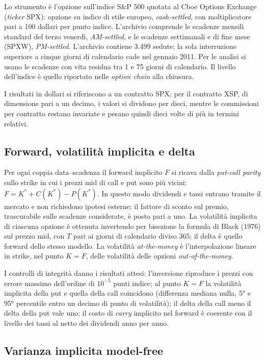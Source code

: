 \documentclass[11pt,a4paper]{article}
\begin{document}
Lo strumento è l'opzione sull'indice S\&P 500 quotata al Cboe Options Exchange (\emph{ticker} SPX): opzione su indice di stile europeo, \emph{cash-settled}, con moltiplicatore pari a 100 dollari per punto indice. L'archivio comprende le scadenze mensili standard del terzo venerdì, \emph{AM-settled}, e le scadenze settimanali e di fine mese (SPXW), \emph{PM-settled}. L'archivio contiene 3.499 sedute; la sola interruzione superiore a cinque giorni di calendario cade nel gennaio 2011. Per le analisi si usano le scadenze con vita residua tra 1 e 75 giorni di calendario. Il livello dell'indice è quello riportato nelle \emph{option chain} alla chiusura.

I risultati in dollari si riferiscono a un contratto SPX; per il contratto XSP, di dimensione pari a un decimo, i valori si dividono per dieci, mentre le commissioni per contratto restano invariate e pesano quindi dieci volte di più in termini relativi.

\subsection{Forward, volatilità implicita e delta}

Per ogni coppia data--scadenza il forward implicito $F$ si ricava dalla \emph{put-call parity} sullo strike in cui i prezzi mid di call e put sono più vicini: $F = K^\ast + C(K^\ast) - P(K^\ast)$. In questo modo dividendi e tassi entrano tramite il mercato e non richiedono ipotesi esterne; il fattore di sconto sul premio, trascurabile sulle scadenze considerate, è posto pari a uno. La volatilità implicita di ciascuna opzione è ottenuta invertendo per bisezione la formula di Black (1976) sul prezzo mid, con $T$ pari ai giorni di calendario diviso 365; il delta è quello forward dello stesso modello. La volatilità \emph{at-the-money} è l'interpolazione lineare in strike, nel punto $K=F$, delle volatilità delle opzioni \emph{out-of-the-money}.

I controlli di integrità danno i risultati attesi: l'inversione riproduce i prezzi con errore massimo dell'ordine di $10^{-5}$ punti indice; al punto $K=F$ la volatilità implicita della put e quella della call coincidono (differenza mediana nulla, 5° e 95° percentile entro un decimo di punto di volatilità); il delta della call meno il delta della put vale uno; il costo di \emph{carry} implicito nel forward è coerente con il livello dei tassi al netto dei dividendi anno per anno.

\subsection{Varianza implicita model-free}
\end{document}
